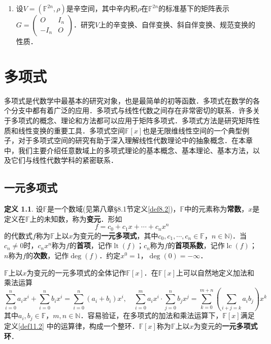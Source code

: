 \documentclass[a4paper,fontset=windows]{ctexbook}
\theoremstyle{definition}
\newtheorem{definition}{定义}[chapter]
\DeclareMathOperator{\lc}{lc}
\DeclareMathOperator{\lt}{lt}
\begin{document}
\begin{enumerate}
\item 设$V=(\mathbb{F}^{2n},\rho)$是辛空间，其中辛内积$\rho$在$\mathbb{F}^{2n}$的标准基下的矩阵表示$G=\begin{pmatrix}O&I_n \\ -I_n&O \end{pmatrix}$．\linebreak 研究$V$上的辛变换、自伴变换、斜自伴变换、规范变换的性质．

\end{enumerate}

\appendix

\chapter{多项式}%

多项式是代数学中最基本的研究对象，也是最简单的初等函数．多项式在数学的各个分支中都有着广泛的应用．多项式与线性代数之间存在非常密切的联系．许多关于多项式的概念、理论和方法都可以应用于矩阵多项式．多项式方法是研究矩阵性质和线性变换的重要工具．多项式空间$\mathbb{F}[x]$也是无限维线性空间的一个典型例子，对于多项式空间的研究有助于深入理解线性代数理论中的抽象概念．在本章中，我们主要介绍任意数域上的多项式理论的基本概念、基本理论、基本方法，以及它们与线性代数学科的紧密联系．

\section{一元多项式}

\begin{definition}\label{def11.1}
设$\mathbb{F}$是一个数域(见第八章\S 8.1节定义\ref{def8.2})，$\mathbb{F}$中的元素称为{\bf 常数}，$x$是定义在$\mathbb{F}$上的未知数，称为{\bf 变元}．形如
$$f=c_0+c_1x+\cdots+c_nx^n$$
的代数式$f$称为$\mathbb{F}$上以$x$为变元的{\bf 一元多项式}，其中$c_0,c_1,\cdots,c_n\in\mathbb{F}$，$n\in\mathbb{N})$．当$c_n\ne 0$时，$c_nx^n$称为$f$的{\bf 首项}，记作$\lt(f)$；$c_n$称为$f$的{\bf 首项系数}，记作$\lc(f)$；$n$称为$f$的{\bf 次数}，记作$\deg(f)$．约定$x^0=1$，$\deg(0)=-\infty$．

$\mathbb{F}$上以$x$为变元的一元多项式的全体记作$\mathbb{F}[x]$．在$\mathbb{F}[x]$上可以自然地定义加法和乘法运算
$$\sum_{i=0}^na_ix^i+\sum_{i=0}^nb_ix^i=\sum_{i=0}^n(a_i+ b_i)x^i,\quad\sum_{i=0}^ma_ix^i\cdot\sum_{j=0}^nb_jx^j=\sum_{k=0}^{m+n}\left(\sum_{i+j=k}a_ib_j\right)x^k$$
其中$a_i,b_j\in\mathbb{F}$，$m,n\in\mathbb{N}$．容易验证，在多项式的加法和乘法运算下，$\mathbb{F}[x]$满足定义\ref{def11.2} 中的运算律，构成一个整环．$\mathbb{F}[x]$称为$\mathbb{F}$上以$x$为变元的{\bf 一元多项式环}．
\end{definition}
\end{document}
